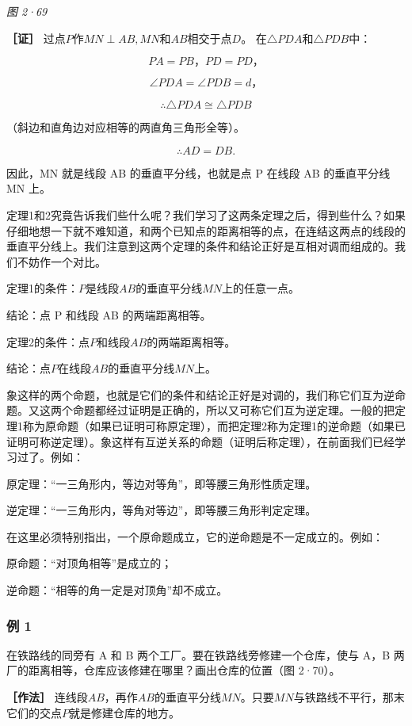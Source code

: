 \emph{图 2·69}

\textbf{［证］} 过点\(P\)作\(MN \perp AB, MN\)和\(AB\)相交于点\(D\)。
在\(\triangle PDA\)和\(\triangle PDB\)中：

\[
PA = PB\text{，} PD = PD\text{，}
\]

\[
\angle PDA = \angle PDB = d\text{，}
\]

\[
\therefore \triangle PDA \cong \triangle PDB
\]

（斜边和直角边对应相等的两直角三角形全等）。

\[
\therefore AD = DB.
\]

因此，MN 就是线段 AB 的垂直平分线，也就是点 P 在线段 AB 的垂直平分线 MN
上。

定理1和2究竟告诉我们些什么呢？我们学习了这两条定理之后，得到些什么？如果仔细地想一下就不难知道，和两个已知点的距离相等的点，在连结这两点的线段的垂直平分线上。我们注意到这两个定理的条件和结论正好是互相对调而组成的。我们不妨作一个对比。

定理1的条件：\(P\)是线段\(AB\)的垂直平分线\(MN\)上的任意一点。

结论：点 P 和线段 AB 的两端距离相等。

定理2的条件：点\(P\)和线段\(AB\)的两端距离相等。

结论：点\(P\)在线段\(AB\)的垂直平分线\(MN\)上。

象这样的两个命题，也就是它们的条件和结论正好是对调的，我们称它们互为逆命题。又这两个命题都经过证明是正确的，所以又可称它们互为逆定理。一般的把定理1称为原命题（如果已证明可称原定理），而把定理2称为定理1的逆命题（如果已证明可称逆定理）。象这样有互逆关系的命题（证明后称定理），在前面我们已经学习过了。例如：

原定理：``一三角形内，等边对等角''，即等腰三角形性质定理。

逆定理：``一三角形内，等角对等边''，即等腰三角形判定定理。

在这里必须特别指出，一个原命题成立，它的逆命题是不一定成立的。例如：

原命题：``对顶角相等''是成立的；

逆命题：``相等的角一定是对顶角''却不成立。

\subsubsection{例 1}

在铁路线的同旁有 A 和 B 两个工厂。要在铁路线旁修建一个仓库，使与 A，B
两厂的距离相等，仓库应该修建在哪里？画出仓库的位置（图 2·70）。

\textbf{［作法］}
连线段\(AB\)，再作\(AB\)的垂直平分线\(MN\)。只要\(MN\)与铁路线不平行，那末它们的交点\(P\)就是修建仓库的地方。

